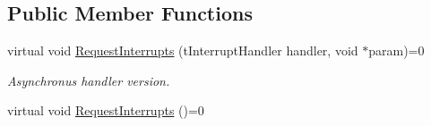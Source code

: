 \subsection*{\-Public \-Member \-Functions}
\begin{DoxyCompactItemize}
\item 
\hypertarget{classInterruptableSensorBase_a9a9cc4a6a409d77704b66d9bccdb5dc1}{virtual void \hyperlink{classInterruptableSensorBase_a9a9cc4a6a409d77704b66d9bccdb5dc1}{\-Request\-Interrupts} (t\-Interrupt\-Handler handler, void $\ast$param)=0}\label{classInterruptableSensorBase_a9a9cc4a6a409d77704b66d9bccdb5dc1}

\begin{DoxyCompactList}\small\item\em \-Asynchronus handler version. \end{DoxyCompactList}\item 
\hypertarget{classInterruptableSensorBase_a540fc3adfd8690e7e643956a9b1be39b}{virtual void \hyperlink{classInterruptableSensorBase_a540fc3adfd8690e7e643956a9b1be39b}{\-Request\-Interrupts} ()=0}\label{classInterruptableSensorBase_a540fc3adfd8690e7e643956a9b1be39b}


\end{DoxyCompactItemize}
